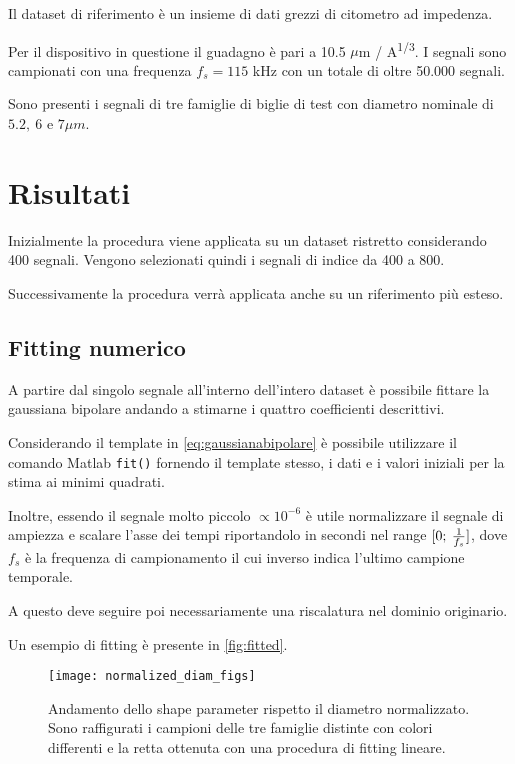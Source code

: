 Il dataset di riferimento è un insieme di dati grezzi di citometro ad impedenza.  

Per il dispositivo in questione il guadagno è pari a 10.5 $\mu$m / A\textsuperscript{1/3}. I segnali sono campionati con una frequenza $f_s=115$ kHz con un totale di oltre 50.000 segnali.

Sono presenti i segnali di tre famiglie di biglie di test con diametro nominale di $5.2,\:6\text{ e }7 \mu m$. 

\section{Risultati}

Inizialmente la procedura viene applicata su un dataset ristretto considerando 400 segnali. Vengono selezionati quindi i segnali di indice da 400 a 800.

Successivamente la procedura verrà applicata anche su un riferimento più esteso.

\subsection{Fitting numerico}

A partire dal singolo segnale all'interno dell'intero dataset è possibile fittare la gaussiana bipolare andando a stimarne i quattro coefficienti descrittivi.

Considerando il template in \cref{eq:gaussianabipolare} è possibile utilizzare il comando Matlab \texttt{fit()} fornendo il template stesso, i dati e i valori iniziali per la stima ai minimi quadrati.

Inoltre, essendo il segnale molto piccolo $\propto 10^{-6}$ è utile normalizzare il segnale di ampiezza e scalare l'asse dei tempi riportandolo in secondi nel range $[0;\:{1\over f_s}]$, dove $f_s$ è la frequenza di campionamento il cui inverso indica l'ultimo campione temporale.

A questo deve seguire poi necessariamente una riscalatura nel dominio originario. 

Un esempio di fitting è presente in \cref{fig:fitted}.

\begin{figure}[t!]
	\centering
	\texttt{[image: normalized\_diam\_figs]}
	\caption{Andamento dello shape parameter rispetto il diametro normalizzato. Sono raffigurati i campioni delle tre famiglie distinte con colori differenti e la retta ottenuta con una procedura di fitting lineare.}
	\label{fig:normalized}
\end{figure}

